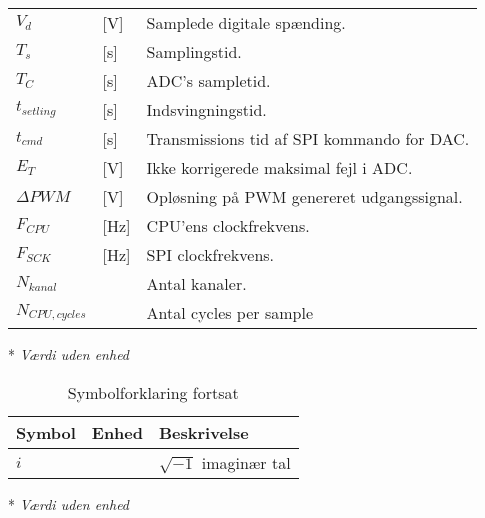 \begin{table}[h!]
\begin{threeparttable}
\begin{tabular}{l l l}
$V_d$ & [\si{\volt}]& Samplede digitale spænding.\\
$T_s$ & [\si{\second}] & Samplingstid. \\
$T_C$ &[\si{\second}] & ADC's sampletid. \\
$t_{setling}$ &[\si{\second}] & Indsvingningstid. \\
$t_{cmd}$ & [\si{\second}] & Transmissions tid af SPI kommando for DAC.\\
$E_T$ & [\si{\volt}] & Ikke korrigerede maksimal fejl i ADC. \\
$\Delta PWM$ & [\si{\volt}] & Opløsning på PWM genereret udgangssignal. \\
$F_{CPU}$ & [\si{\hertz}] & CPU'ens clockfrekvens. \\
$F_{SCK}$ & [\si{\hertz}] & SPI clockfrekvens.\\
$N_{kanal}$\tnote{*} & & Antal kanaler. \\
$N_{CPU,cycles}$ & & Antal cycles per sample \\
\bottomrule
\end{tabular}
\begin{tablenotes}
\item[*] \textit{Værdi uden enhed}
\end{tablenotes}
\end{threeparttable}
\end{table}




\begin{table}[h!]
\centering
\caption{Symbolforklaring fortsat}
\label{tab:symboler2}
\begin{threeparttable}
\begin{tabular}{l l l}
\toprule
\multicolumn{1}{l}{Symbol}       &
\multicolumn{1}{l}{Enhed}        &
\multicolumn{1}{l}{Beskrivelse}  \\ 
\midrule
$i$\tnote{*}		&								& $\sqrt{-1}$ imaginær tal	\\
\bottomrule
\end{tabular}
\begin{tablenotes}
\item[*] \textit{Værdi uden enhed}
\end{tablenotes}
\end{threeparttable}
\end{table}


